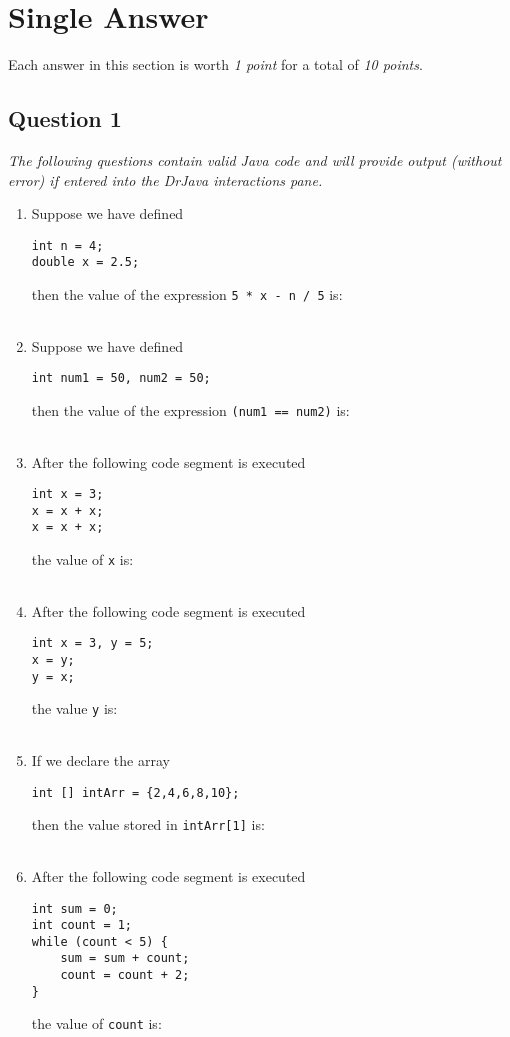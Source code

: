 \documentclass[12pt]{report}
\newcommand{\Ans}{\hfill {\Huge\begin{tabular}{|c|} \hline \hspace{2.5cm} \hfill \\ \hline \end{tabular}} }
\begin{document}
\section*{Single Answer}
Each answer in this section is worth \emph{1 point} for a total of \emph{10 points}.
\subsection*{Question 1}
\emph{The following questions contain valid Java code and will provide output (without error) if entered into 
the DrJava interactions pane.} 


\renewcommand{\labelenumi}{\alph{enumi}.}
\begin{enumerate}
\item Suppose we have defined
\begin{verbatim}
int n = 4;
double x = 2.5;
\end{verbatim}
then the value of the expression \texttt{5 * x - n / 5} is: \Ans

\item Suppose we have defined
\begin{verbatim}
int num1 = 50, num2 = 50;
\end{verbatim}
then the value of the expression \texttt{(num1 == num2)} is: \Ans

\item After the following code segment is executed
\begin{verbatim}
int x = 3;
x = x + x;
x = x + x;
\end{verbatim}
the value of \texttt{x} is: \Ans

\item After the following code segment is executed
\begin{verbatim}
int x = 3, y = 5;
x = y;
y = x;
\end{verbatim}
the value \texttt{y} is: \Ans

\clearpage
\item If we declare the array
\begin{verbatim}
int [] intArr = {2,4,6,8,10};
\end{verbatim}
then the value stored in \texttt{intArr[1]} is: \Ans

\item After the following code segment is executed
\begin{verbatim}
int sum = 0;
int count = 1;
while (count < 5) {
    sum = sum + count;
    count = count + 2;
}
\end{verbatim}
the value of \texttt{count} is: \Ans


\end{enumerate}
\end{document}

